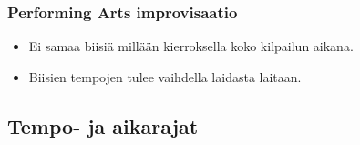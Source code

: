 \documentclass[12pt, a4paper, oneside]{article}
\begin{document}
\subsubsection{Performing Arts improvisaatio}

\begin{itemize}[itemsep=-2pt]
    \item Ei samaa biisiä millään kierroksella koko kilpailun aikana.
    \item Biisien tempojen tulee vaihdella laidasta laitaan.
\end{itemize}

\subsection{Tempo- ja aikarajat} \label{subsec:rajat}
\end{document}
